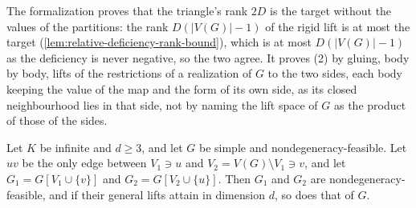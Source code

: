 \begin{fmlnote}
  The formalization proves that the triangle's rank $2D$ is the target
  without the values of the partitions: the rank $D(|V(G)| - 1)$ of the
  rigid lift is at most the target
  (\cref{lem:relative-deficiency-rank-bound}), which is at most
  $D(|V(G)| - 1)$ as the deficiency is never negative, so the two agree.
  It proves (2) by gluing, body by body, lifts of the restrictions of a
  realization of $G$ to the two sides, each body keeping the value of the
  map and the form of its own side, as its closed neighbourhood lies in
  that side, not by naming the lift space of $G$ as the product of those
  of the sides.
\end{fmlnote}

\begin{lemma}
  \label{lem:pencil-d-lift-cut-edge}
  \leanok
  Let $K$ be infinite and $d \ge 3$, and let $G$ be simple and
  nondegeneracy-feasible. Let $uv$ be the only edge between $V_1 \ni u$
  and $V_2 = V(G) \setminus V_1 \ni v$, and let
  $G_1 = G[V_1 \cup \{v\}]$ and $G_2 = G[V_2 \cup \{u\}]$. Then $G_1$ and
  $G_2$ are nondegeneracy-feasible, and if their general lifts attain in
  dimension $d$, so does that of $G$.
\end{lemma}
